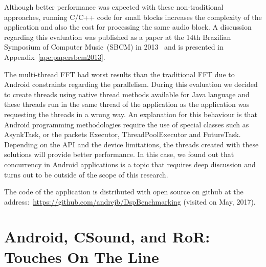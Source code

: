 Although better performance was expected with these non-traditional approaches, running C/C++ code for small blocks increases the complexity of the application and also the cost for processing the same audio block.
A discussion regarding this evaluation was published as a paper at the 14th Brazilian Symposium of Computer Music~(SBCM) in 2013~\citep{deCarvalhoJunior2013fftbenchmark} and is presented in Appendix~\ref{ape:papersbcm2013}.

The multi-thread FFT had worst results than the traditional FFT due to Android constraints regarding the parallelism.
During this evaluation we decided to create threads using native thread methods available for Java language and these threads run in the same thread of the application as the application was requesting the threads in a wrong way.
An explanation for this behaviour is that Android programming methodologies require the use of special classes such as AsynkTask, or the packets Executor, ThreadPoolExecutor and FutureTask.
Depending on the API and the device limitations, the threads created with these solutions will provide better performance.
In this case, we found out that concurrency in Android applications is a topic that requires deep discussion and turns out to be outside of the scope of this research.


The code of the application is distributed with open source on github at the address:~\url{https://github.com/andrejb/DspBenchmarking} (visited on May, 2017).

\section{Android, CSound, and RoR: Touches On The Line}
\label{apesec:apptouchesontheline}

